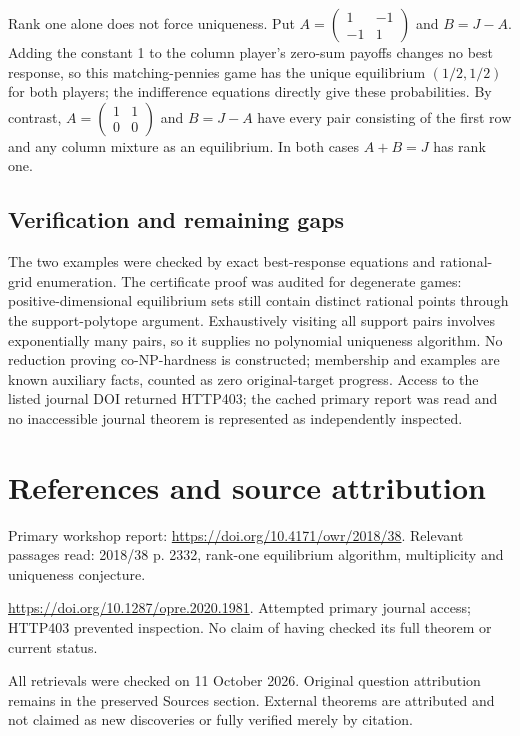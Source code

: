 \documentclass[11pt]{article}
\begin{document}
Rank one alone does not force uniqueness. Put $A=\begin{pmatrix}1&-1\\-1&1\end{pmatrix}$ and $B=J-A$. Adding the constant 1 to the column player's zero-sum payoffs changes no best response, so this matching-pennies game has the unique equilibrium $(1/2,1/2)$ for both players; the indifference equations directly give these probabilities. By contrast, $A=\begin{pmatrix}1&1\\0&0\end{pmatrix}$ and $B=J-A$ have every pair consisting of the first row and any column mixture as an equilibrium. In both cases $A+B=J$ has rank one.
\subsection{Verification and remaining gaps}
The two examples were checked by exact best-response equations and rational-grid enumeration. The certificate proof was audited for degenerate games: positive-dimensional equilibrium sets still contain distinct rational points through the support-polytope argument. Exhaustively visiting all support pairs involves exponentially many pairs, so it supplies no polynomial uniqueness algorithm. No reduction proving co-NP-hardness is constructed; membership and examples are known auxiliary facts, counted as zero original-target progress. Access to the listed journal DOI returned HTTP403; the cached primary report was read and no inaccessible journal theorem is represented as independently inspected.

\section{References and source attribution}
Primary workshop report: \url{https://doi.org/10.4171/owr/2018/38}. Relevant passages read: 2018/38 p. 2332, rank-one equilibrium algorithm, multiplicity and uniqueness conjecture.

\url{https://doi.org/10.1287/opre.2020.1981}. Attempted primary journal access; HTTP403 prevented inspection. No claim of having checked its full theorem or current status.

All retrievals were checked on 11 October 2026. Original question attribution remains in the preserved Sources section. External theorems are attributed and not claimed as new discoveries or fully verified merely by citation.
\end{document}
